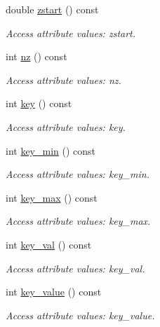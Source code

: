 \begin{DoxyCompactItemize}
double \hyperlink{struct_d_d4hep_1_1_x_m_l_1_1_dimension_a5f1353afd0857d09c54f73dc46b71887}{zstart} () const
\begin{DoxyCompactList}\small\item\em Access attribute values\+: zstart. \end{DoxyCompactList}\item 
int \hyperlink{struct_d_d4hep_1_1_x_m_l_1_1_dimension_ad2d2ed9996c11cca8b9a722da31c05d6}{nz} () const
\begin{DoxyCompactList}\small\item\em Access attribute values\+: nz. \end{DoxyCompactList}\item 
int \hyperlink{struct_d_d4hep_1_1_x_m_l_1_1_dimension_a4f371f2d7b5a43b3793c8301d1c70718}{key} () const
\begin{DoxyCompactList}\small\item\em Access attribute values\+: key. \end{DoxyCompactList}\item 
int \hyperlink{struct_d_d4hep_1_1_x_m_l_1_1_dimension_a3d630cc257e18cb14e924032cfd9862b}{key\+\_\+min} () const
\begin{DoxyCompactList}\small\item\em Access attribute values\+: key\+\_\+min. \end{DoxyCompactList}\item 
int \hyperlink{struct_d_d4hep_1_1_x_m_l_1_1_dimension_a1312c2db5e4f58edcf5b20457b5c44ea}{key\+\_\+max} () const
\begin{DoxyCompactList}\small\item\em Access attribute values\+: key\+\_\+max. \end{DoxyCompactList}\item 
int \hyperlink{struct_d_d4hep_1_1_x_m_l_1_1_dimension_a77287ed56013760f95872cb31f655417}{key\+\_\+val} () const
\begin{DoxyCompactList}\small\item\em Access attribute values\+: key\+\_\+val. \end{DoxyCompactList}\item 
int \hyperlink{struct_d_d4hep_1_1_x_m_l_1_1_dimension_a00113c7bbfb4a2514335c1feaf88a173}{key\+\_\+value} () const
\begin{DoxyCompactList}\small\item\em Access attribute values\+: key\+\_\+value. \end{DoxyCompactList}\item 

\end{DoxyCompactItemize}
